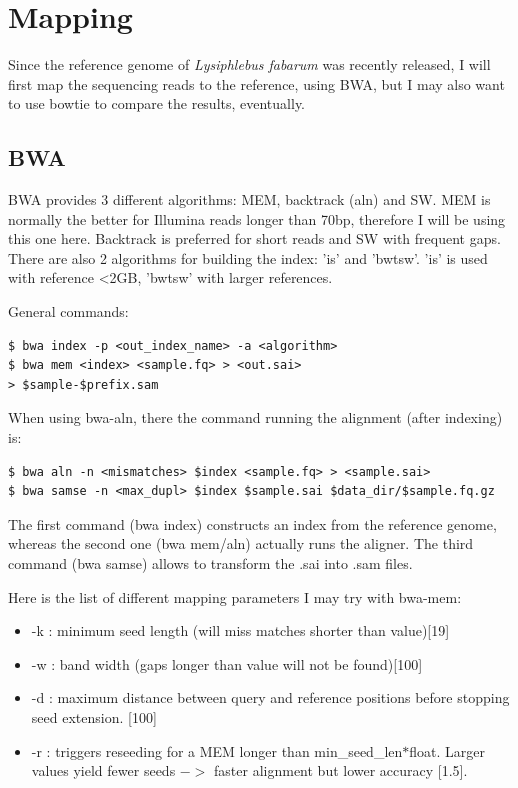 \documentclass[10pt,a4paper]{report}
\begin{document}
\section{Mapping}
Since the reference genome of \textit{Lysiphlebus fabarum} was recently released, I will first map the sequencing reads to the reference, using BWA, but I may also want to use bowtie to compare the results, eventually.
\subsection{BWA}

BWA provides 3 different algorithms: MEM, backtrack (aln) and SW. MEM is normally the better for Illumina reads longer than 70bp, therefore I will be using this one here. Backtrack is preferred for short reads and SW with frequent gaps.
There are also 2 algorithms for building the index: 'is' and 'bwtsw'. 'is' is used with reference <2GB, 'bwtsw' with larger references.

General commands: 
\begin{lstlisting}
$ bwa index -p <out_index_name> -a <algorithm>
$ bwa mem <index> <sample.fq> > <out.sai>
> $sample-$prefix.sam
\end{lstlisting}

When using bwa-aln, there the command running the alignment (after indexing) is:
\begin{lstlisting}
$ bwa aln -n <mismatches> $index <sample.fq> > <sample.sai>
$ bwa samse -n <max_dupl> $index $sample.sai $data_dir/$sample.fq.gz
\end{lstlisting}
The first command (bwa index) constructs an index from the reference genome, whereas the second one (bwa mem/aln) actually runs the aligner. The third command (bwa samse) allows to transform the .sai into .sam files.

Here is the list of different mapping parameters I may try with bwa-mem:
\begin{itemize}
\item -k : minimum seed length (will miss matches shorter than value)[19]
\item -w : band width (gaps longer than value will not be found)[100]
\item -d : maximum distance between query and reference positions before stopping seed extension. [100]
\item -r : triggers reseeding for a MEM longer than min\_seed\_len$*$float. Larger values yield fewer seeds $->$ faster alignment but lower accuracy [1.5].
\end{itemize}
\end{document}

